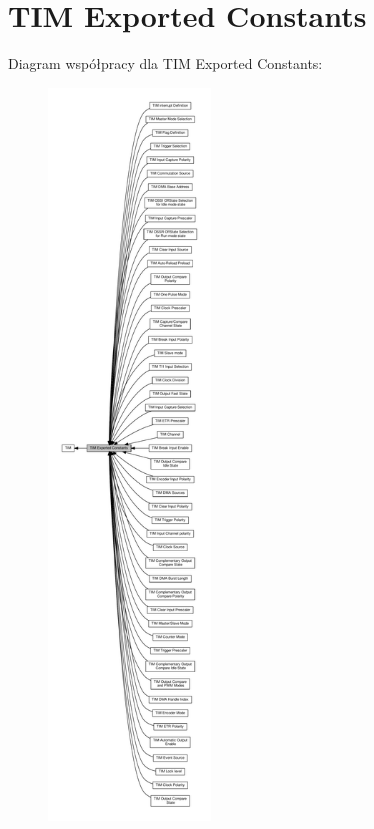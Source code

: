 \hypertarget{group___t_i_m___exported___constants}{}\section{T\+IM Exported Constants}
\label{group___t_i_m___exported___constants}
Diagram współpracy dla T\+IM Exported Constants\+:\nopagebreak
\begin{figure}[H]
\begin{center}
\leavevmode
\includegraphics[height=550pt]{group___t_i_m___exported___constants}
\end{center}
\end{figure}
